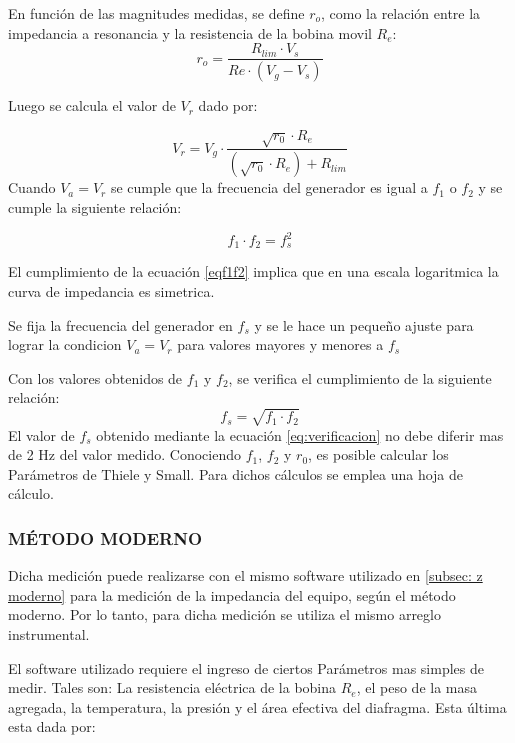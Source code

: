 \documentclass[]{article}
\begin{document}
\begin{multicols}{2}
En función de las magnitudes medidas, se define $r_o$, como la relación entre
la impedancia a resonancia y la resistencia de la bobina movil $R_e$:
\begin{equation}
  r_{o}=\frac{R_{lim} \cdot V_s}{Re \cdot (V_g-V_s)}
  \label{eq:ro}
\end{equation}

Luego se calcula el valor de $V_r$ dado por:

\begin{equation}
V_r = V_g \cdot \frac{\sqrt{r_0} \cdot R_e }{\left(\sqrt{r_0} \cdot R_e \right) + R_{lim}}
\end{equation}
Cuando $V_a=V_r$ se cumple que la frecuencia del generador es igual a $f_1$ o
 $f_2$  y se cumple la siguiente relación:

\begin{equation}
  f_1 \cdot f_2 = f_s^2
  \label{eqf1f2}
\end{equation}

El cumplimiento de la ecuación \ref{eqf1f2}
 implica que en una escala logaritmica
la curva de impedancia es simetrica.

Se fija la frecuencia del generador en $f_s$ y se le hace un pequeño ajuste
para lograr la condicion $V_a=V_r$ para valores mayores y menores a $f_s$

Con los valores obtenidos de $f_1$ y $f_2$, se verifica el cumplimiento de la
siguiente relación:
\begin{equation}
  f_s=\sqrt{f_1\cdot f_2}
  \label{eq:verificacion}
\end{equation}
El valor de $f_s$ obtenido mediante la ecuación \ref{eq:verificacion} no debe
diferir mas de 2 Hz del valor medido.
Conociendo $f_1$, $f_2$ y $r_0$, es posible calcular los Parámetros de Thiele y
Small. Para dichos cálculos se emplea una hoja de cálculo.

\subsubsection{MÉTODO MODERNO}
Dicha medición puede realizarse con el mismo software utilizado en \ref{subsec: z moderno}
para la medición de la impedancia del equipo, según el
método moderno. Por lo tanto, para dicha medición se utiliza el mismo
arreglo instrumental.

El software utilizado requiere el ingreso de ciertos Parámetros mas simples
de medir. Tales son: La resistencia eléctrica de la bobina $R_e$, el peso de
la masa agregada, la temperatura, la presión y el área efectiva del diafragma.
Esta última esta dada por:


\end{multicols}
\end{document}
